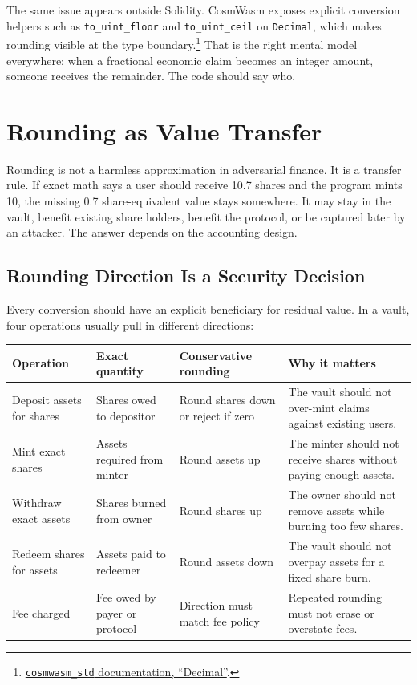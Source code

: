 The same issue appears outside Solidity. CosmWasm exposes explicit conversion helpers such as \texttt{to\_uint\_floor} and \texttt{to\_uint\_ceil} on \texttt{Decimal}, which makes rounding visible at the type boundary.\footnote{\href{https://docs.rs/cosmwasm-std/latest/cosmwasm_std/struct.Decimal.html}{\texttt{cosmwasm\_std} documentation, ``Decimal''}.} That is the right mental model everywhere: when a fractional economic claim becomes an integer amount, someone receives the remainder. The code should say who.

\section{Rounding as Value Transfer}

Rounding is not a harmless approximation in adversarial finance. It is a transfer rule. If exact math says a user should receive 10.7 shares and the program mints 10, the missing 0.7 share-equivalent value stays somewhere. It may stay in the vault, benefit existing share holders, benefit the protocol, or be captured later by an attacker. The answer depends on the accounting design.

\subsection{Rounding Direction Is a Security Decision}

Every conversion should have an explicit beneficiary for residual value. In a vault, four operations usually pull in different directions:

\begin{table}[htbp]
\centering
\small
\renewcommand{\arraystretch}{1.18}
\begin{tabularx}{\textwidth}{@{}>{\RaggedRight\arraybackslash}p{}>{\RaggedRight\arraybackslash}p{}>{\RaggedRight\arraybackslash}p{}X@{}}
\toprule
Operation & Exact quantity & Conservative rounding & Why it matters \\
\midrule
Deposit assets for shares & Shares owed to depositor & Round shares down or reject if zero & The vault should not over-mint claims against existing users. \\
Mint exact shares & Assets required from minter & Round assets up & The minter should not receive shares without paying enough assets. \\
Withdraw exact assets & Shares burned from owner & Round shares up & The owner should not remove assets while burning too few shares. \\
Redeem shares for assets & Assets paid to redeemer & Round assets down & The vault should not overpay assets for a fixed share burn. \\
Fee charged & Fee owed by payer or protocol & Direction must match fee policy & Repeated rounding must not erase or overstate fees. \\
\bottomrule
\end{tabularx}
\end{table}

